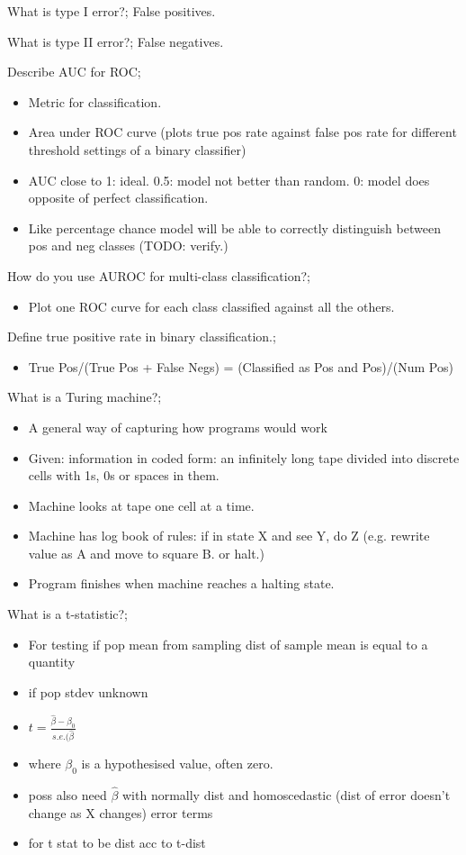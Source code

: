\documentclass{article}
\begin{document}
What is type I error?; False positives. 

What is type II error?; False negatives.

Describe AUC for ROC; \begin{itemize} \item Metric for classification. \item Area under ROC curve (plots true pos rate against false pos rate for different threshold settings of a binary classifier) \item AUC close to 1: ideal. 0.5: model not better than random. 0: model does opposite of perfect classification.  \item Like percentage chance model will be able to correctly distinguish between pos and neg classes (TODO: verify.) \end{itemize}

How do you use AUROC for multi-class classification?; \begin{itemize} \item Plot one ROC curve for each class classified against all the others. \end{itemize}

Define true positive rate in binary classification.; \begin{itemize} \item True Pos/(True Pos + False Negs) = (Classified as Pos and Pos)/(Num Pos) \end{itemize}

What is a Turing machine?; \begin{itemize} \item A general way of capturing how programs would work \item Given: information in coded form: an infinitely long tape divided into discrete cells with 1s, 0s or spaces in them. \item Machine looks at tape one cell at a time. \item Machine has log book of rules: if in state X and see Y, do Z (e.g. rewrite value as A and move to square B. or halt.) \item Program finishes when machine reaches a halting state. \end{itemize}

What is a t-statistic?; \begin{itemize} \item For testing if pop mean from sampling dist of sample mean is equal to a quantity \item if pop stdev unknown \item $t = \frac{\hat{\beta}-\beta_0}{s.e.(\hat{\beta}}$ \item where $\beta_0$ is a hypothesised value, often zero. \item poss also need $\hat{\beta}$ with normally dist and homoscedastic (dist of error doesn't change as X changes) error terms \item for t stat to be dist acc to t-dist \end{itemize} 
\end{document}
